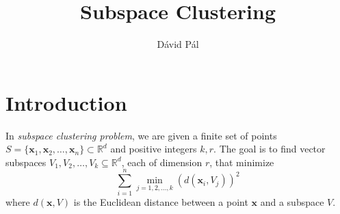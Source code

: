 \documentclass[12pt]{article}
\newcommand{\R}{\mathbb{R}}
\newcommand{\x}{\mathbf{x}}
\begin{document}
\title{Subspace Clustering}
\author{D\'avid P\'al}
\maketitle

\section{Introduction}

In \emph{subspace clustering problem}, we are given
a finite set of points $S = \{\x_1, \x_2, \dots, \x_n\} \subset \R^d$
and positive integers $k,r$.
The goal is to find vector subspaces $V_1, V_2, \dots, V_k \subseteq \R^d$,
each of dimension $r$, that minimize
\begin{equation}
\label{equation:cost-function}
\sum_{i=1}^n \min_{j=1,2,\dots,k} \left( d(\x_i, V_j) \right)^2
\end{equation}
where $d(\x,V)$ is the Euclidean distance between a point $\x$
and a subspace $V$.
\end{document}
